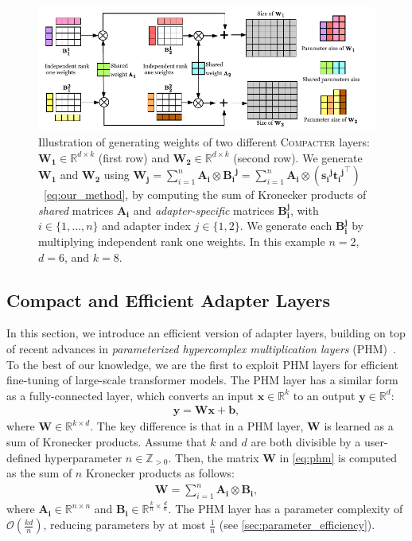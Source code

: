\documentclass{article}
\newcommand{\compacter}{\textsc{Compacter}\xspace}
\begin{document}
\begin{figure}[tp]%
\centering %
\includegraphics[width=1\textwidth, trim={0cm 0.1cm 0.5cm 0.2cm}, clip]{figures/compacter_phm_version_2.pdf} 
\caption{Illustration of generating weights of two different \compacter layers:  $\bm{W_1} \in \mathbb{R}^{d \times k}$ (first row) and $\bm{W_2}  \in \mathbb{R}^{d \times k}$ (second row). We generate $\bm{W_1}$ and $\bm{W_2}$ using $\bm{W_j} = \sum_{i=1}^n \bm{A_i} \otimes \bm{{B_i}^j} = \sum_{i=1}^n \bm{A_i} \otimes (\bm{{s_i}^j}{\bm{{t_i}^j}}^\top)$~\eqref{eq:our_method}, by computing the sum of Kronecker products of \emph{shared} matrices $\bm{A_i}$ and \emph{adapter-specific} matrices $\bm{B_i^j}$, with $i\in\{1, \dots, n\}$ and adapter index $j\in\{1, 2\}$. We generate each $\bm{B_i^j}$ by multiplying independent rank one weights. In this example $n=2$, $d=6$, and $k=8$.  } \vspace{-1.2em}
\label{fig:compactformer}
\end{figure} 

\subsection{Compact and Efficient Adapter Layers} \label{sec:compacter}
In this section, we introduce an efficient version of adapter layers, building on top of recent advances in \emph{parameterized hypercomplex multiplication layers} (PHM)~\citep{zhang2021beyond}.  To the best of our knowledge, we are the first to exploit PHM layers for efficient fine-tuning of large-scale transformer models. The PHM layer has a similar form as a fully-connected layer, which converts an input $\bm{x}\in\mathbb{R}^k$ to an output $\bm{y}\in\mathbb{R}^d$:  
\begin{align}
    \bm{y} =  \bm{W}\bm{x}+\bm{b}, \label{eq:phm}  %
\end{align} where $\bm{W}\in\mathbb{R}^{k\times d}$. The key difference is that in a PHM layer, $\bm{W}$ is learned as a sum of Kronecker products. Assume that $k$ and $d$ are both divisible by a user-defined hyperparameter $n \in \mathbb{Z}_{>0}$. Then, the matrix $\bm{W}$ in \eqref{eq:phm} is computed as the sum of $n$ Kronecker products as follows: 
\begin{align}
\bm{W} = \sum_{i=1}^n \bm{A_i} \otimes \bm{B_i}, 
\label{eq:phm-params} 
\end{align}
where $\bm{A_i}\in\mathbb{R}^{n\times n}$ and $\bm{B_i}\in\mathbb{R}^{\frac{k}{n}\times \frac{d}{n}}$. The PHM layer has a parameter complexity of $\mathcal{O}(\frac{kd}{n})$, reducing parameters by at most $\frac{1}{n}$ \citep{zhang2021beyond} (see \textsection \ref{sec:parameter_efficiency}).
\end{document}
